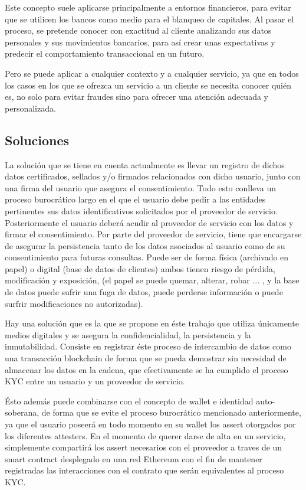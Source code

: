\documentclass[12pt]{report}
\begin{document}
Este concepto suele aplicarse principalmente a entornos financieros, para evitar que se utilicen los bancos como medio para el blanqueo de capitales. Al pasar el proceso, se pretende conocer con exactitud al cliente analizando sus datos personales y sus movimientos bancarios, para así crear unas expectativas y predecir el comportamiento transaccional en un futuro.

Pero se puede aplicar a cualquier contexto y a cualquier servicio, ya que en todos los casos en los que se ofrezca un servicio a un cliente se necesita conocer quién es, no solo para evitar fraudes sino para ofrecer una atención adecuada y personalizada.

\subsection{Soluciones}

La solución que se tiene en cuenta actualmente es llevar un registro de dichos datos certificados, sellados y/o firmados relacionados con dicho usuario, junto con una firma del usuario que asegura el consentimiento. Todo esto conlleva un proceso burocrático largo en el que el usuario debe pedir a las entidades pertinentes sus datos identificativos solicitados por el proveedor de servicio. Posteriormente el usuario deberá acudir al proveedor de servicio con los datos y firmar el consentimiento. Por parte del proveedor de servicio, tiene que encargarse de asegurar la persistencia tanto de los datos asociados al usuario como de su consentimiento para futuras consultas. Puede ser de forma física (archivado en papel) o digital (base de datos de clientes) ambos tienen riesgo de pérdida, modificación y exposición, (el papel se puede quemar, alterar, robar ... , y la base de datos puede sufrir una fuga de datos, puede perderse información o puede surfrir modificaciones no autorizadas).

Hay una solución que es la que se propone en éste trabajo que utiliza únicamente medios digitales y se asegura la confidencialidad, la persistencia y la inmutabilidad. Consiste en registrar éste proceso de intercambio de datos como una transacción blockchain de forma que se pueda demostrar sin necesidad de almacenar los datos en la cadena, que efectivamente se ha cumplido el proceso KYC entre un usuario y un proveedor de servicio.

Ésto además puede combinarse con el concepto de wallet e identidad auto-soberana, de forma que se evite el proceso burocrático mencionado anteriormente, ya que el usuario poseerá en todo momento en su wallet los assert otorgados por los diferentes attesters. En el momento de querer darse de alta en un servicio, simplemente compartirá los assert necesarios con el proveedor a traves de un smart contract desplegado en una red Ethereum con el fin de mantener registradas las interacciones con el contrato que serán equivalentes al proceso KYC. 
\end{document}

